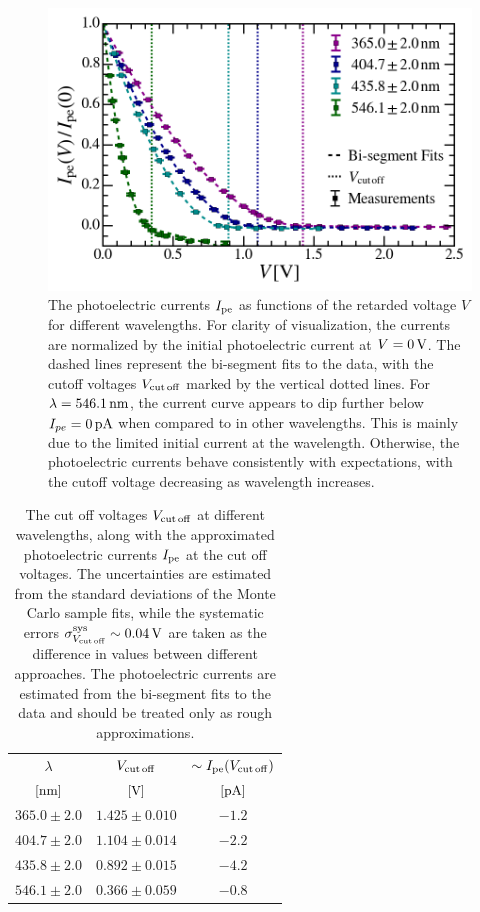 \documentclass[aps,twocolumn,secnumarabic,balancelastpage,amsmath,amssymb,nofootinbib,floatfix]{revtex4-1}
\newcommand{\nm}{\,{\rm nm}}
\newcommand{\pA}{\,{\rm pA}}
\newcommand{\V}{\,{\rm V}}
\begin{document}
\begin{figure}
    \centering
    \includegraphics[width=0.49 \textwidth]{Figures/measurements.png}
    \caption{The photoelectric currents $I_{\rm{pe}}$ as functions of the retarded voltage $V$ for different wavelengths. For clarity of visualization, the currents are normalized by the initial photoelectric current at $V=0\V$. The dashed lines represent the bi-segment fits to the data, with the cutoff voltages $V_{\rm{cut\,off}}$ marked by the vertical dotted lines. For $\lambda = 546.1\nm$, the current curve appears to dip further below $I_{pe} = 0\pA$ when compared to in other wavelengths. This is mainly due to the limited initial current at the wavelength. Otherwise, the photoelectric currents behave consistently with expectations, with the cutoff voltage decreasing as wavelength increases. }
    \label{fig:measurements}
\end{figure}

\begin{table}
    \centering
    \addtolength{\tabcolsep}{3pt}
    \def\arraystretch{1.5}
    \begin{tabular}{c c c}
        \hline
        $\lambda$ & $V_{\rm{cut\,off}}$ & $\sim I_{\rm{pe}} (V_{\rm{cut\,off}})$ \\ [0ex]
        $[\rm{nm}]$ & $[\rm{V}]$ & $[\rm{pA}]$ \\ [1ex]
        \hline\hline

        $365.0 \pm 2.0$ & $1.425 \pm 0.010$ & $- 1.2$ \\
        $404.7 \pm 2.0$ & $1.104 \pm 0.014$ & $- 2.2$ \\
        $435.8 \pm 2.0$ & $0.892 \pm 0.015$ & $- 4.2$ \\
        $546.1 \pm 2.0$ & $0.366 \pm 0.059$ & $- 0.8$ \\
        \hline
        
    \end{tabular}
    \caption{The cut off voltages $V_{\rm{cut\,off}}$ at different wavelengths, along with the approximated photoelectric currents $I_{\rm{pe}}$ at the cut off voltages. The uncertainties are estimated from the standard deviations of the Monte Carlo sample fits, while the systematic errors $\sigma_{V_{\rm{cut\,off}}}^{\rm{sys}} \sim 0.04\V$ are taken as the difference in values between different approaches. The photoelectric currents are estimated from the bi-segment fits to the data and should be treated only as rough approximations.}
    \label{tab:cut_off_voltages}    
\end{table}
\end{document}
